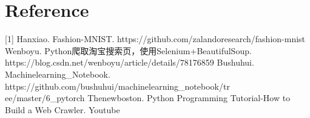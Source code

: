 \documentclass[11pt]{article}
\begin{document}
    \section{Reference}\label{reference}

{[}1{]} Hanxiao. Fashion-MNIST.
https://github.com/zalandoresearch/fashion-mnist \newline
[2] Wenboyu. Python爬取淘宝搜索页，使用Selenium+BeautifulSoup.
https://blog.csdn.net/wenboyu/article/details/78176859 \newline
[3] Bushuhui. Machinelearning\_Notebook.
https://github.com/bushuhui/machinelearning\_notebook/tr
\newline ee/master/6\_pytorch \newline
[4] Thenewboston. Python Programming Tutorial-How to Build a Web
Crawler. Youtube


    
    
    
    
\end{document}
